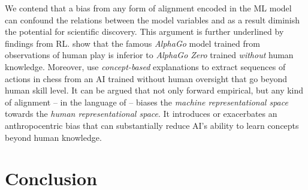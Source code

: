 \documentclass{article}
\theoremstyle{plain}
\theoremstyle{definition}
\theoremstyle{remark}
\begin{document}
We contend that a bias from any form of alignment encoded in the ML model can confound the relations between the model variables and as a result diminish the potential for scientific discovery.
%
This argument is further underlined by findings from RL. 
\citet{alphagozero_silver} show that the famous \textit{AlphaGo} model trained from observations of human play is inferior to \textit{AlphaGo Zero} trained \textit{without} human knowledge. Moreover, \citet{schut2023bridginghumanaiknowledgegap} use \textit{concept-based} explanations to extract sequences of actions in chess from an AI trained without human oversight that go beyond human skill level. %
It can be argued that not only forward empirical, but any kind of alignment -- in the language of \citet{schut2023bridginghumanaiknowledgegap} -- biases the \textit{machine representational space} towards the \textit{human representational space}. It introduces or exacerbates an anthropocentric bias that can substantially reduce AI's ability to learn concepts beyond human knowledge.







\section{Conclusion}
\end{document}
